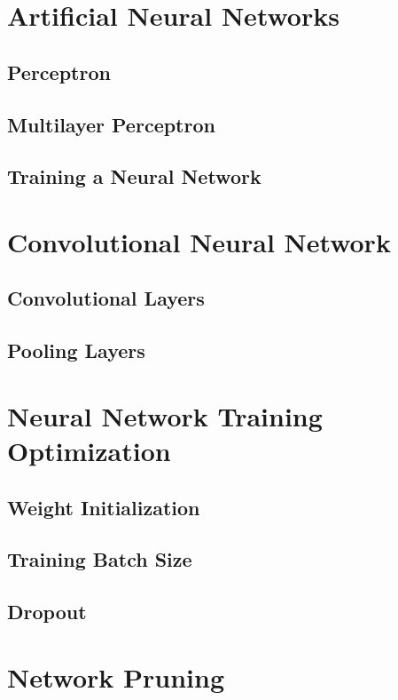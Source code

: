 \documentclass[UKenglish]{ifimaster}
\begin{document}
    
    \section{Artificial Neural Networks}
        \subsection{Perceptron}


        \subsection{Multilayer Perceptron}


        \subsection{Training a Neural Network}

    
    \section{Convolutional Neural Network}
        \subsection{Convolutional Layers}


        \subsection{Pooling Layers}

    
    \section{Neural Network Training Optimization}
        \subsection{Weight Initialization}


        \subsection{Training Batch Size}


        \subsection{Dropout}


    \section{Network Pruning}
\end{document}
